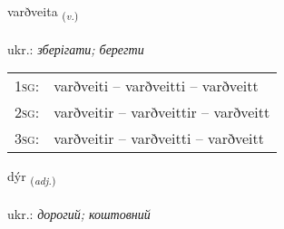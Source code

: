 \documentclass[frontgrid, backgrid]{flacards}\usepackage[]{graphicx}\usepackage[]{xcolor}
\begin{document}
\renewcommand{\flhead}{\vskip5pt \fboxsep=0pt {\small\bfseries\footnotesize Sagnorð | дієслово}}
\renewcommand{\fcfoot}{\vskip5pt \fboxsep=0pt \hspace{2pt}{\small\bfseries\footnotesize 2K}}

\renewcommand{\blhead}{\vskip5pt {\small\bfseries\footnotesize Sagnorð | дієслово }}
\renewcommand{\bcfoot}{\vskip5pt \hspace{2pt}{\small\bfseries\footnotesize 2K}}


{varðveita \small{\textsubscript{(\textit{v.})}} \\[1ex] %
\textphonetic{[varðveita]} \\
ukr.: \emph{зберігати; берегти} \\  [2ex]
\renewcommand*{\arraystretch}{0.8}
\begin{tabular}{p{1cm}l}
\textsc{1sg}: & varðveiti -- varðveitti -- varðveitt \\ 
\textsc{2sg}: & varðveitir -- varðveittir -- varðveitt \\ 
\textsc{3sg}: & varðveitir -- varðveitti -- varðveitt \\ 
\end{tabular}
}

\renewcommand{\flhead}{\vskip5pt \fboxsep=0pt {\small\bfseries\footnotesize Lýsingarorð | прикметник}}
\renewcommand{\fcfoot}{\vskip5pt \fboxsep=0pt \hspace{2pt}{\small\bfseries\footnotesize 2K}}

\renewcommand{\blhead}{\vskip5pt {\small\bfseries\footnotesize Lýsingarorð | прикметник }}
\renewcommand{\bcfoot}{\vskip5pt \hspace{2pt}{\small\bfseries\footnotesize 2K}}


{dýr \small{\textsubscript{(\textit{adj.})}} \\[1ex] %
\textphonetic{[tiːr]} \\
ukr.: \emph{дорогий; коштовний} \\  [2ex]
\renewcommand*{\arraystretch}{0.8}
}
\end{document}
